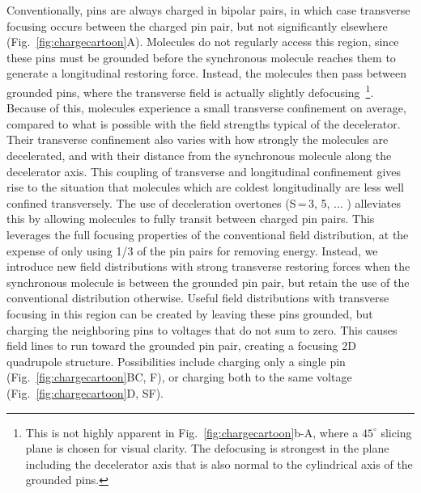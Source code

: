 \documentclass[%
 reprint,
 amsmath,amssymb,
 aps,
prl,
]{revtex4-1}
\begin{document}
Conventionally, pins are always charged in bipolar pairs, in which case transverse focusing occurs between the charged pin pair, but not significantly elsewhere (Fig.~\ref{fig:chargecartoon}A).
Molecules do not regularly access this region, since these pins must be grounded before the synchronous molecule reaches them to generate a longitudinal restoring force.
Instead, the molecules then pass between grounded pins, where the transverse field is actually slightly defocusing~\footnote{This is not highly apparent in Fig.~\ref{fig:chargecartoon}b-A, where a $45^\circ$ slicing plane is chosen for visual clarity. The defocusing is strongest in the plane including the decelerator axis that is also normal to the cylindrical axis of the grounded pins.}.
Because of this, molecules experience a small transverse confinement on average, compared to what is possible with the field strengths typical of the decelerator. 
Their transverse confinement also varies with how strongly the molecules are decelerated, and with their distance from the synchronous molecule along the decelerator axis. 
This coupling of transverse and longitudinal confinement gives rise to the situation that molecules which are coldest longitudinally are less well confined transversely.
The use of deceleration overtones (S\,=\,3, 5, ... ) \cite{VanDeMeerakker2005a} alleviates	 this by allowing molecules to fully transit between charged pin pairs. 
This leverages the full focusing properties of the conventional field distribution, at the expense of only using 1/3 of the pin pairs for removing energy. 
Instead, we introduce new field distributions with strong transverse restoring forces when the synchronous molecule is between the grounded pin pair, but retain the use of the conventional distribution otherwise.
Useful field distributions with transverse focusing in this region can be created by leaving these pins grounded, but charging the neighboring pins to voltages that do not sum to zero.
This causes field lines to run toward the grounded pin pair, creating a focusing 2D quadrupole structure.
Possibilities include charging only a single pin (Fig.~\ref{fig:chargecartoon}BC, F), or charging both to the same voltage (Fig.~\ref{fig:chargecartoon}D, SF).
\end{document}

